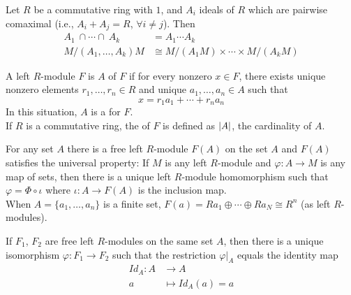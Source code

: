 \begin{theorem}
 Let $R$ be a commutative ring with $1$, and $A_i$ ideals of $R$ which are pairwise comaximal (i.e., $A_i + A_j = R$, $\forall i \neq j$). Then
\begin{align}
A_1 \ \cap \cdots \cap \ A_k &= A_1 \cdots A_k \nonumber \\
M/(A_1, \ldots, A_k)M &\cong M/(A_1 M) \times \cdots \times M/(A_k M) \nonumber
\end{align}
\end{theorem}

\begin{definition}
A left $R$-module $F$ is  $A$ of $F$ if for every nonzero $x \in F$, there exists unique nonzero elements $r_1, \ldots, r_n \in R$ and unique $a_1, \ldots, a_n \in A$ such that
\begin{equation}
x = r_1 a_1 + \cdots + r_n a_n \nonumber
\end{equation}
In this situation, $A$ is a  for $F$.\\
If $R$ is a commutative ring, the  of $F$ is defined as $\left\lvert A\right\rvert$, the cardinality of $A$.
\end{definition}

\begin{theorem}
\label{thm:universalproperty}
For any set $A$ there is a free left $R$-module $F(A)$ on the set $A$ and $F(A)$ satisfies the universal property: If $M$ is any left $R$-module and $\varphi: A \rightarrow M$ is any map of sets, then there is a unique left $R$-module homomorphism such that $\varphi = \Phi \circ \iota$ where $\iota: A \rightarrow F(A)$ is the inclusion map.\\
When $A=\{a_1, \ldots, a_n\}$ is a finite set, $F(a)=Ra_1 \oplus \cdots \oplus Ra_N \cong R^n$ (as left $R$-modules).
\end{theorem}

\begin{corollary}
If $F_1$, $F_2$ are free left $R$-modules on the same set $A$, then there is a unique isomorphism $\varphi: F_1 \rightarrow F_2$ such that the restriction $\varphi|_{A}$ equals the identity map
\begin{align}
Id_{A}: A &\rightarrow A \nonumber \\
a &\mapsto Id_{A}(a) = a \nonumber
\end{align}
\end{corollary}


